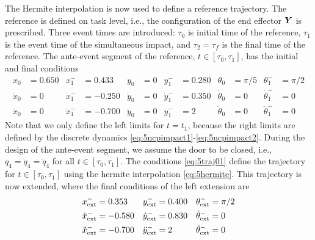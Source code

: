 \documentclass[../DC2019003Bouma.tex]{subfiles}
\begin{document}
The Hermite interpolation is now used to define a reference trajectory. The reference is defined on task level, i.e., the configuration of the end effector ${\boldsymbol{Y}}$ is prescribed. Three event times are introduced: $\tau_0$ is initial time of the reference, $\tau_1$ is the event time of the simultaneous impact, and $\tau_2 = \tau_f$ is the final time of the reference. The ante-event segment of the reference, $t \in [\tau_0,\tau_1]$, has the initial and final conditions
\begin{align}
x_0&= 0.650 &x^-_1&= 0.433 &y_0&= 0 &y^-_1&= 0.280 &\theta_0&= \pi/5 &\theta^-_1&= \pi/2\nonumber\\
\dot{x}_0&= 0 &\dot{x}^-_1&= -0.250 &\dot{y}_0&= 0 &\dot{y}^-_1&= 0.350 &\dot{\theta}_0&= 0 &\dot{\theta}^-_1&= 0\label{eq:5traj01}\\
\ddot{x}_0&= 0 &\ddot{x}^-_1&= -0.700 &\ddot{y}_0&= 0 &\ddot{y}^-_1&= 2 &\ddot{\theta}_0&= 0 &\ddot{\theta}^-_1&= 0\nonumber
\end{align}
Note that we only define the left limits for $t=t_1$, because the right limits are defined by the discrete dynamics \eqref{eq:5ncpimpact1}-\eqref{eq:5ncpimpact2}. During the design of the ante-event segment, we assume the door to be closed, i.e., $q_4=\dot{q}_4=\ddot{q}_4$ for all $t\in[\tau_0,\tau_1]$. The conditions \eqref{eq:5traj01} define the trajectory for $t\in[\tau_0,\tau_1]$ using the hermite interpolation \eqref{eq:5hermite}. This trajectory is now extended, where the final conditions of the left extension are
\begin{align}
x^-_{\textnormal{ext}}&= 0.353 &y^-_{\textnormal{ext}}&= 0.400 &\theta^-_{\textnormal{ext}}&= \pi/2\nonumber\\
\dot{x}^-_{\textnormal{ext}}&= -0.580 &\dot{y}^-_{\textnormal{ext}}&= 0.830 &\dot{\theta}^-_{\textnormal{ext}}&= 0\\
\ddot{x}^-_{\textnormal{ext}}&= -0.700 &\ddot{y}^-_{\textnormal{ext}}&= 2 &\ddot{\theta}^-_{\textnormal{ext}}&= 0\nonumber
\end{align}
\end{document}
